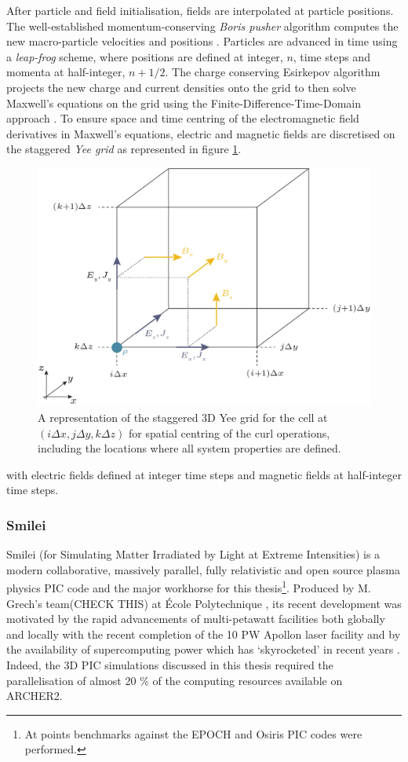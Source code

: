 After particle and field initialisation, fields are interpolated at particle positions. The well-established momentum-conserving \textit{Boris pusher} algorithm computes the new macro-particle velocities and positions \cite{borisRelativisticPlasmaSimulationoptimization1970}. Particles are advanced in time using a \textit{leap-frog }scheme, where positions are defined at integer, $n$, time steps and momenta at half-integer, $n + 1/2$. The charge conserving Esirkepov algorithm \cite{esirkepovExactChargeConservation2001} projects the new charge and current densities onto the grid to then solve Maxwell's equations on the grid using the Finite-Difference-Time-Domain approach \cite{tafloveComputationalElectromagneticsFiniteDifference2005}. To ensure space and time centring of the electromagnetic field derivatives in Maxwell's equations, electric and magnetic fields are discretised on the staggered \textit{Yee grid} as represented in figure \ref{fig:introyeegrid}. 
\begin{figure}
	\centering
	\includegraphics[width=0.7\linewidth]{figures/intro/intro_yee_grid}
	\caption[A representation of the staggered Yee grid.]{A representation of the staggered 3D Yee grid for the cell at $(i\Delta x, j\Delta y, k\Delta z)$ for spatial centring of the curl operations, including the locations where all system properties are defined.}
	\label{fig:introyeegrid}
\end{figure}
with electric fields defined at integer time steps and magnetic fields at half-integer time steps.

\subsubsection{Smilei}
Smilei (for Simulating Matter Irradiated by Light at Extreme Intensities) is a modern collaborative, massively parallel, fully relativistic and open source plasma physics PIC code and the major workhorse for this thesis\footnote{At points benchmarks against the EPOCH and Osiris PIC codes were performed.}. Produced by M. Grech's team(CHECK THIS) at École Polytechnique \cite{derouillatSmileiCollaborativeOpensource2018}, its recent development was motivated by the rapid advancements of multi-petawatt facilities both globally and locally with the recent completion of the 10 PW Apollon laser facility and by the availability of supercomputing power which has `skyrocketed' in recent years \cite{derouillatSmileiCollaborativeOpensource2018}. Indeed, the 3D \ac{PIC} simulations discussed in this thesis required the parallelisation of almost 20 \% of the computing resources available on ARCHER2.

